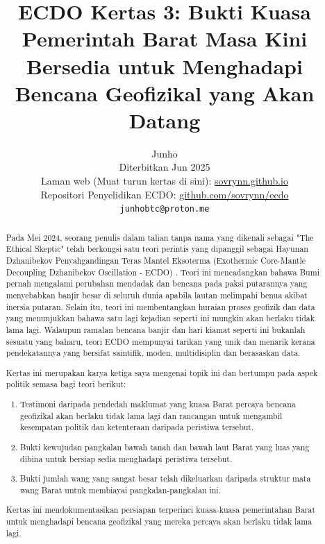 \documentclass[10pt,twocolumn,letterpaper]{article}
\begin{document}
\title{ECDO Kertas 3: Bukti Kuasa Pemerintah Barat Masa Kini Bersedia untuk Menghadapi Bencana Geofizikal yang Akan Datang}

\author{Junho\\
Diterbitkan Jun 2025\\
Laman web (Muat turun kertas di sini): \href{https://sovrynn.github.io}{sovrynn.github.io}\\
Repositori Penyelidikan ECDO: \href{https://github.com/sovrynn/ecdo}{github.com/sovrynn/ecdo}\\
{\tt\small junhobtc@proton.me}
}
\maketitle

\begin{abstract}
Pada Mei 2024, seorang penulis dalam talian tanpa nama yang dikenali sebagai "The Ethical Skeptic" \cite{0} telah berkongsi satu teori perintis yang dipanggil sebagai Hayunan Dzhanibekov Penyahgandingan Teras Mantel Eksoterma (Exothermic Core-Mantle Decoupling Dzhanibekov Oscillation - ECDO) \cite{1}. Teori ini mencadangkan bahawa Bumi pernah mengalami perubahan mendadak dan bencana pada paksi putarannya yang menyebabkan banjir besar di seluruh dunia apabila lautan melimpahi benua akibat inersia putaran. Selain itu, teori ini membentangkan huraian proses geofizik dan data yang menunjukkan bahawa satu lagi kejadian seperti ini mungkin akan berlaku tidak lama lagi. Walaupun ramalan bencana banjir dan hari kiamat seperti ini bukanlah sesuatu yang baharu, teori ECDO mempunyai tarikan yang unik dan menarik kerana pendekatannya yang bersifat saintifik, moden, multidisiplin dan berasaskan data.

Kertas ini merupakan karya ketiga saya \cite{2,3} mengenai topik ini dan bertumpu pada aspek politik semasa bagi teori berikut:
\begin{flushleft}
\begin{enumerate}
    \item Testimoni daripada pendedah maklumat yang kuasa Barat percaya bencana geofizikal akan berlaku tidak lama lagi dan rancangan untuk mengambil kesempatan politik dan ketenteraan daripada peristiwa tersebut.
    \item Bukti kewujudan pangkalan bawah tanah dan bawah laut Barat yang luas yang dibina untuk bersiap sedia menghadapi peristiwa tersebut.
    \item Bukti jumlah wang yang sangat besar telah dikeluarkan daripada struktur mata wang Barat untuk membiayai pangkalan-pangkalan ini.
\end{enumerate}
\end{flushleft}
Kertas ini mendokumentasikan persiapan terperinci kuasa-kuasa pemerintahan Barat untuk menghadapi bencana geofizikal yang mereka percaya akan berlaku tidak lama lagi.
\end{abstract}
\end{document}
